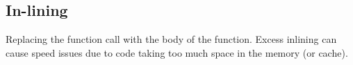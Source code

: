 		\begin{multicols}{3}		
			 \ \\
			 \ \\ \ \\
			
		\end{multicols}	
		
	\subsection{In-lining}
		Replacing the function call with the body of the function. Excess inlining can cause speed issues due to code taking too much space in the memory (or cache).
